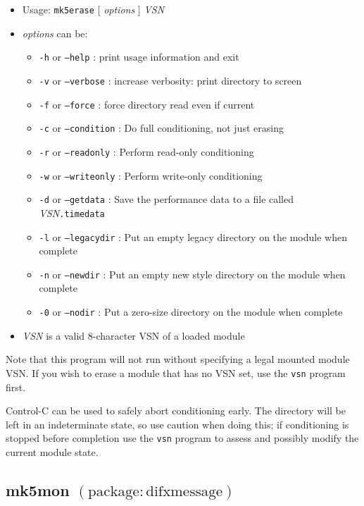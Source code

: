 \begin{itemize}
\item[] Usage: {\tt mk5erase} $[$ {\em options} $]$ {\em VSN}
\item[] {\em options} can be:
\begin{itemize}
\item[] {\tt -h} or {\tt --help} : print usage information and exit
\item[] {\tt -v} or {\tt --verbose} : increase verbosity: print directory to screen
\item[] {\tt -f} or {\tt --force} : force directory read even if current
\item[] {\tt -c} or {\tt --condition} : Do full conditioning, not just erasing
\item[] {\tt -r} or {\tt --readonly} : Perform read-only conditioning
\item[] {\tt -w} or {\tt --writeonly} : Perform write-only conditioning
\item[] {\tt -d} or {\tt --getdata} : Save the performance data to a file called {\em VSN}{\tt .timedata}
\item[] {\tt -l} or {\tt --legacydir} : Put an empty legacy directory on the module when complete
\item[] {\tt -n} or {\tt --newdir} : Put an empty new style directory on the module when complete
\item[] {\tt -0} or {\tt --nodir} : Put a zero-size directory on the module when complete
\end{itemize}
\item[] {\em VSN} is a valid 8-character VSN of a loaded module
\end{itemize}

\noindent
Note that this program will not run without specifying a legal mounted module VSN.
If you wish to erase a module that has no VSN set, use the {\tt vsn} program first.

\noindent
Control-C can be used to safely abort conditioning early.
The directory will be left in an indeterminate state, so use caution when doing this; if conditioning is stopped before completion use the {\tt vsn} program to assess and possibly modify the current module state.








\subsection{mk5mon {\small $\mathrm{(package: difxmessage)}$}} \label{sec:mk5mon} 

